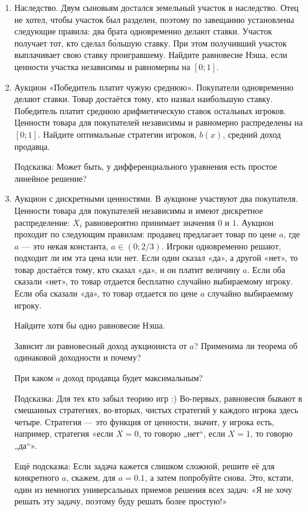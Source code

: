 \begin{enumerate}
\item Наследство. Двум сыновьям достался земельный участок в наследство. Отец не хотел, чтобы участок был разделен, поэтому по завещанию установлены следующие правила: два брата одновременно делают ставки. Участок получает тот, кто сделал б\'{о}льшую ставку. При этом получивший участок выплачивает свою ставку проигравшему. Найдите равновесие Нэша, если ценности участка независимы и равномерны на $ [0;1] $.

\item Аукцион «Победитель платит чужую среднюю». Покупатели одновременно делают ставки. Товар достаётся тому, кто назвал наибольшую ставку. Победитель платит среднюю арифметическую ставок остальных игроков. Ценности товара для покупателей независимы и равномерно распределены на $ [0;1] $. Найдите оптимальные стратегии игроков, $ b(x) $, средний доход продавца.

Подсказка: Может быть, у дифференциального уравнения есть простое линейное решение?


\item Аукцион с дискретными ценностями. В аукционе участвуют два покупателя. Ценности товара для покупателей независимы и имеют дискретное распределение: $ X_{i} $ равновероятно принимает значения $ 0 $ и $ 1 $. Аукцион проходит по следующим правилам: продавец предлагает товар по цене $ a $, где $ a $ — это некая константа, $ a\in (0;2/3) $. Игроки одновременно решают, подходит ли им эта цена или нет. Если один сказал «да», а другой «нет», то товар достаётся тому, кто сказал «да», и он платит величину $a$. Если оба сказали «нет», то товар отдается бесплатно случайно выбираемому игроку. Если оба сказали «да», то товар отдается по цене $ a $ случайно выбираемому игроку.

Найдите хотя бы одно равновесие Нэша.

Зависит ли равновесный доход аукциониста от $ a $? Применима ли теорема об одинаковой доходности и почему?

При каком $a$ доход продавца будет максимальным?

Подсказка: Для тех кто забыл теорию игр :) Во-первых, равновесия бывают в смешанных стратегиях, во-вторых, чистых стратегий у каждого игрока здесь четыре. Стратегия — это функция от ценности, значит, у игрока есть, например, стратегия «если $ X=0 $, то говорю „нет“, если $ X=1 $, то говорю „да“».

Ещё подсказка: Если задача кажется слишком сложной, решите её для конкретного $ a $, скажем, для $ a=0.1 $, а затем попробуйте снова. Это, кстати, один из немногих универсальных приемов решения всех задач: «Я не хочу решать эту задачу, поэтому буду решать более простую!»


\end{enumerate}


